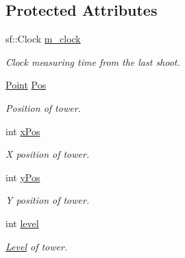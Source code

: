 \subsection*{Protected Attributes}
\begin{DoxyCompactItemize}
\item 
\mbox{\label{class_tower_adf389dfdea0c8ed3e4849425ef677a41}} 
sf\+::\+Clock \mbox{\hyperlink{class_tower_adf389dfdea0c8ed3e4849425ef677a41}{m\+\_\+clock}}
\begin{DoxyCompactList}\small\item\em Clock measuring time from the last shoot. \end{DoxyCompactList}\item 
\mbox{\label{class_tower_a7a53fd511f9f644e512120a3b03766c1}} 
\mbox{\hyperlink{class_point}{Point}} \mbox{\hyperlink{class_tower_a7a53fd511f9f644e512120a3b03766c1}{Pos}}
\begin{DoxyCompactList}\small\item\em Position of tower. \end{DoxyCompactList}\item 
\mbox{\label{class_tower_ad726aba82ac69315792a799d3c66843e}} 
int \mbox{\hyperlink{class_tower_ad726aba82ac69315792a799d3c66843e}{x\+Pos}}
\begin{DoxyCompactList}\small\item\em X position of tower. \end{DoxyCompactList}\item 
\mbox{\label{class_tower_a955cb3b5d915b7e2bb0c8b1e0c012e13}} 
int \mbox{\hyperlink{class_tower_a955cb3b5d915b7e2bb0c8b1e0c012e13}{y\+Pos}}
\begin{DoxyCompactList}\small\item\em Y position of tower. \end{DoxyCompactList}\item 
\mbox{\label{class_tower_a586375a39e6817983339b36225379da0}} 
int \mbox{\hyperlink{class_tower_a586375a39e6817983339b36225379da0}{level}}
\begin{DoxyCompactList}\small\item\em \mbox{\hyperlink{class_level}{Level}} of tower. \end{DoxyCompactList}\end{DoxyCompactItemize}
